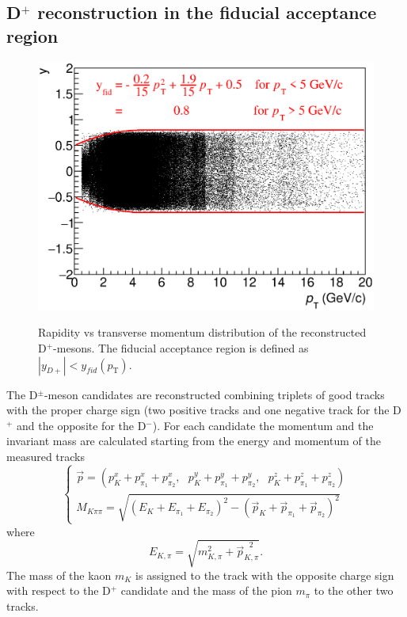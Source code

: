 \documentclass[b5paper,10pt,twoside,oldstyle,classica]{toptesi}
\newcommand{\pt}{p_\text{T}}
\begin{document}
\subsection{D$^+$ reconstruction in the fiducial acceptance region}
\begin{figure}[tb]
\begin{center}
{\includegraphics[scale = 0.4]{fiducialacc.eps}}
\caption{Rapidity vs transverse momentum distribution of the reconstructed D$^+$-mesons. The fiducial acceptance region is defined as $|y_{D+}| < y_{fid}(\pt)$.}
\label{fidacc}
\end{center}
\end{figure}
The D$^\pm$-meson candidates are reconstructed combining triplets of good tracks with the proper charge sign (two positive tracks and one negative track for the D$^+$ and the opposite for the D$^-$). For each candidate the momentum and the invariant mass are calculated starting from the energy and momentum of the measured tracks
\begin{equation}
\begin{cases}
\vec{p} = (p^x_K+p^x_{\pi_1}+p^x_{\pi_2},\text{ }p^y_K+p^y_{\pi_1}+p^y_{\pi_2},\text{ }p^z_K+p^z_{\pi_1}+p^z_{\pi_2})\\[3mm]
M_{K\pi\pi} = \sqrt{(E_K+E_{\pi_1}+E_{\pi_2})^2-(\vec{p}_K+\vec{p}_{\pi_1}+\vec{p}_{\pi_2})^2}
\end{cases}
\end{equation}
where
\begin{equation}
 E_{K,\pi} = \sqrt{m_{K,\pi}^2+\vec{p}_{K,\pi}^{\text{ }2}}.
\end{equation}
The mass of the kaon $m_K$ is assigned to the track with the opposite charge sign with respect to the D$^+$ candidate and the mass of the pion $m_\pi$ to the other two tracks. 
\end{document}
